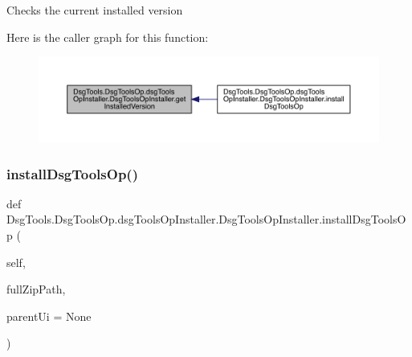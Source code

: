 \begin{DoxyVerb}Checks the current installed version
\end{DoxyVerb}
 Here is the caller graph for this function\+:
\nopagebreak
\begin{figure}[H]
\begin{center}
\leavevmode
\includegraphics[width=350pt]{class_dsg_tools_1_1_dsg_tools_op_1_1dsg_tools_op_installer_1_1_dsg_tools_op_installer_a5bc63c03ccc06ea353edf4ccf5999564_icgraph}
\end{center}
\end{figure}
\mbox{\label{class_dsg_tools_1_1_dsg_tools_op_1_1dsg_tools_op_installer_1_1_dsg_tools_op_installer_a8895201444e39cf4eb5634f28fa16a85}} 
\subsubsection{\texorpdfstring{install\+Dsg\+Tools\+Op()}{installDsgToolsOp()}}
{\footnotesize\ttfamily def Dsg\+Tools.\+Dsg\+Tools\+Op.\+dsg\+Tools\+Op\+Installer.\+Dsg\+Tools\+Op\+Installer.\+install\+Dsg\+Tools\+Op (\begin{DoxyParamCaption}\item[{}]{self,  }\item[{}]{full\+Zip\+Path,  }\item[{}]{parent\+Ui = {\ttfamily None} }\end{DoxyParamCaption})}

